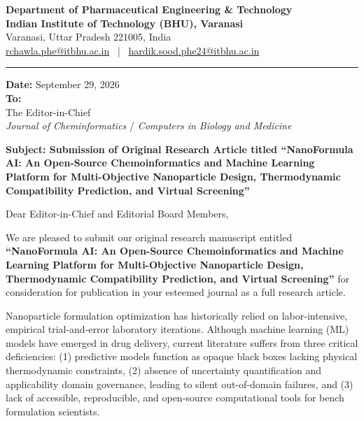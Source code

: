 \documentclass[11pt]{article}
\begin{document}
\noindent
\textbf{\large Department of Pharmaceutical Engineering \& Technology} \\
\textbf{Indian Institute of Technology (BHU), Varanasi} \\
Varanasi, Uttar Pradesh 221005, India \\
\href{mailto:rchawla.phe@itbhu.ac.in}{rchawla.phe@itbhu.ac.in} \ | \ \href{mailto:hardik.sood.phe24@itbhu.ac.in}{hardik.sood.phe24@itbhu.ac.in} \\
\rule{\textwidth}{1.5pt}

\vspace{0.8em}
\noindent
\textbf{Date:} September 29, 2026 \\[0.5em]
\textbf{To:} \\
The Editor-in-Chief \\
\textit{Journal of Cheminformatics} / \textit{Computers in Biology and Medicine}

\vspace{1.2em}
\noindent
\textbf{Subject: Submission of Original Research Article titled ``NanoFormula AI: An Open-Source Chemoinformatics and Machine Learning Platform for Multi-Objective Nanoparticle Design, Thermodynamic Compatibility Prediction, and Virtual Screening''}

\vspace{1em}
\noindent
Dear Editor-in-Chief and Editorial Board Members,

\vspace{0.6em}
We are pleased to submit our original research manuscript entitled \textbf{``NanoFormula AI: An Open-Source Chemoinformatics and Machine Learning Platform for Multi-Objective Nanoparticle Design, Thermodynamic Compatibility Prediction, and Virtual Screening''} for consideration for publication in your esteemed journal as a full research article.

Nanoparticle formulation optimization has historically relied on labor-intensive, empirical trial-and-error laboratory iterations. Although machine learning (ML) models have emerged in drug delivery, current literature suffers from three critical deficiencies: (1) predictive models function as opaque black boxes lacking physical thermodynamic constraints, (2) absence of uncertainty quantification and applicability domain governance, leading to silent out-of-domain failures, and (3) lack of accessible, reproducible, and open-source computational tools for bench formulation scientists.
\end{document}
